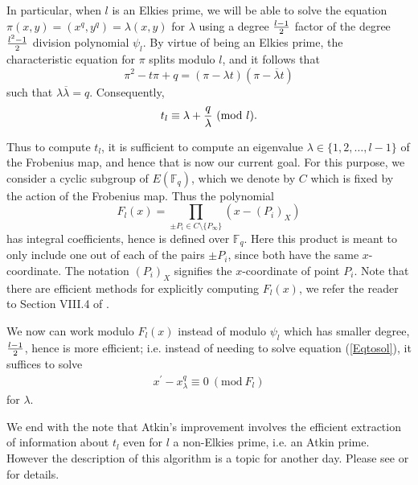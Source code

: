 \documentclass{article}
\newcommand{\f}{\mathbb{F}}
\begin{document}
In particular, when $l$ is an Elkies prime, we will be able to solve
the equation $\pi(x,y) = (x^q,y^q) = \lambda(x,y)$ for $\lambda$
using a degree ${l-1 \over 2}$ factor of the degree ${l^2 - 1 \over
2}$ division polynomial $\psi_l$.  By virtue of being an Elkies
prime, the characteristic equation for $\pi$ splits modulo $l$, and
it follows that
$$\pi^2 - t\pi + q = (\pi-\lambda t)(\pi - \overline{\lambda}t)$$
such that $\lambda\overline{\lambda}=q$.  Consequently, $$t_l \equiv
\lambda + {q \over \lambda} ~(\mathrm{mod~}l).$$

Thus to compute $t_l$, it is sufficient to compute an eigenvalue
$\lambda \in \{1,2,\dots,l-1\}$ of the Frobenius map, and hence that
is now our current goal.
For this purpose, we consider a cyclic subgroup of $E(\f_q)$, which
we denote by $C$ which is fixed by the action of the Frobenius map.
Thus the polynomial
$$F_l(x) = \prod_{\pm P_i \in C \setminus \{P_\infty\}} (x- (P_i)_X)$$ has integral coefficients, hence
is defined over $\f_q$.  Here this product is meant to only include
one out of each of the pairs $\pm P_i$, since both have the same
$x$-coordinate.  The notation $(P_i)_X$ signifies the $x$-coordinate
of point $P_i$.  Note that there are efficient methods for
explicitly computing $F_l(x)$, we refer the reader to Section VIII.4
of \cite{Blake}.

We now can work modulo $F_l(x)$ instead of modulo $\psi_l$ which has
smaller degree, ${l-1 \over 2}$, hence is more efficient; i.e.
instead of needing to solve equation (\ref{Eqtosol}), it suffices to
solve
\begin{eqnarray} x^\prime - x^q_{\lambda} \equiv 0 ~(\mathrm{mod~}F_l)\end{eqnarray} for
$\lambda$.

We end with the note that Atkin's improvement involves the efficient
extraction of information about $t_l$ even for $l$ a non-Elkies
prime, i.e. an Atkin prime.  However the description of this
algorithm is a topic for another day.  Please see \cite{Blake} or
\cite{Schoof2} for details.



%
\end{document}
